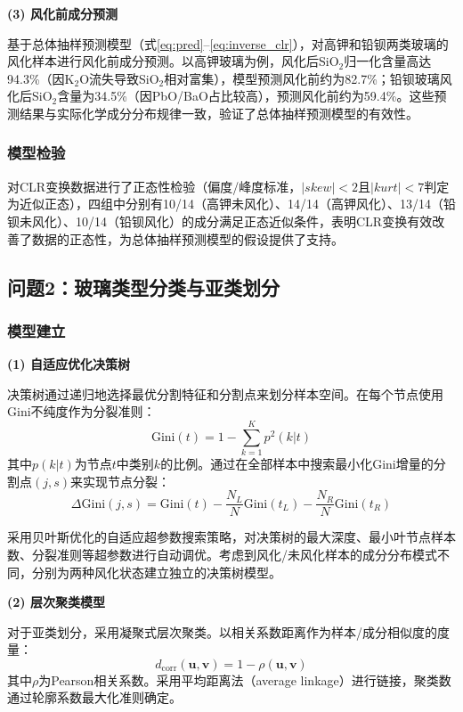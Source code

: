 \documentclass[12pt,a4paper]{ctexart}
\begin{document}
\textbf{(3) 风化前成分预测}

基于总体抽样预测模型（式\ref{eq:pred}--\ref{eq:inverse_clr}），对高钾和铅钡两类玻璃的风化样本进行风化前成分预测。以高钾玻璃为例，风化后SiO$_2$归一化含量高达94.3\%（因K$_2$O流失导致SiO$_2$相对富集），模型预测风化前约为82.7\%；铅钡玻璃风化后SiO$_2$含量为34.5\%（因PbO/BaO占比较高），预测风化前约为59.4\%。这些预测结果与实际化学成分分布规律一致，验证了总体抽样预测模型的有效性。

\subsubsection{模型检验}

对CLR变换数据进行了正态性检验（偏度/峰度标准，$|skew|<2$且$|kurt|<7$判定为近似正态），四组中分别有10/14（高钾未风化）、14/14（高钾风化）、13/14（铅钡未风化）、10/14（铅钡风化）的成分满足正态近似条件，表明CLR变换有效改善了数据的正态性，为总体抽样预测模型的假设提供了支持。

\subsection{问题2：玻璃类型分类与亚类划分}

\subsubsection{模型建立}

\textbf{(1) 自适应优化决策树}

决策树通过递归地选择最优分割特征和分割点来划分样本空间\cite{6}。在每个节点使用Gini不纯度作为分裂准则：
\begin{equation}
    \text{Gini}(t)=1-\sum_{k=1}^{K}p^2(k|t)
    \label{eq:gini}
\end{equation}
其中$p(k|t)$为节点$t$中类别$k$的比例。通过在全部样本中搜索最小化Gini增量的分割点$(j,s)$来实现节点分裂：
\begin{equation}
    \Delta\text{Gini}(j,s)=\text{Gini}(t)-\frac{N_L}{N}\text{Gini}(t_L)-\frac{N_R}{N}\text{Gini}(t_R)
    \label{eq:gini_split}
\end{equation}

采用贝叶斯优化的自适应超参数搜索策略\cite{7}，对决策树的最大深度、最小叶节点样本数、分裂准则等超参数进行自动调优。考虑到风化/未风化样本的成分分布模式不同，分别为两种风化状态建立独立的决策树模型。

\textbf{(2) 层次聚类模型}

对于亚类划分，采用凝聚式层次聚类。以相关系数距离作为样本/成分相似度的度量：
\begin{equation}
    d_{\text{corr}}(\mathbf{u},\mathbf{v})=1-\rho(\mathbf{u},\mathbf{v})
    \label{eq:corr_dist}
\end{equation}
其中$\rho$为Pearson相关系数。采用平均距离法（average linkage）进行链接，聚类数通过轮廓系数最大化准则确定\cite{8}。
\end{document}
